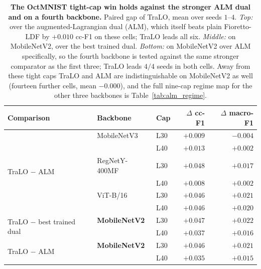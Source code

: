 \documentclass[10pt]{article}
\begin{document}
\begin{table}[t]\centering\small\color{blue}
\setlength{\tabcolsep}{5pt}
\caption{\color{blue}\textbf{The OctMNIST tight-cap win holds against the
stronger ALM dual and on a fourth backbone.} Paired gap of TraLO, mean over seeds
$1$--$4$. \emph{Top:} over the augmented-Lagrangian dual (ALM), which itself beats
plain Fioretto-LDF by $+0.010$ cc-F1 on these cells; TraLO leads all six.
\emph{Middle:} on MobileNetV2, over the best trained dual. \emph{Bottom:} on
MobileNetV2 over ALM specifically, so the fourth backbone is tested against the
same stronger comparator as the first three; TraLO leads $4/4$ seeds in both
cells. Away from these tight caps TraLO and ALM are indistinguishable on
MobileNetV2 as well (fourteen further cells, mean $-0.000$), and the full
nine-cap regime map for the other three backbones is
Table~\ref{tab:alm_regime}.}
\label{tab:almbb}
\begin{tabular}{lll rr}
\toprule
Comparison & Backbone & Cap & $\Delta$ cc-F1 & $\Delta$ macro-F1 \\
\midrule
\multirow{6}{*}{TraLO $-$ ALM}
 & MobileNetV3   & L30 & $+0.009$ & $-0.004$ \\
 &               & L40 & $+0.013$ & $+0.002$ \\
 & RegNetY-400MF & L30 & $+0.048$ & $+0.017$ \\
 &               & L40 & $+0.008$ & $+0.002$ \\
 & ViT-B/16      & L30 & $+0.046$ & $+0.021$ \\
 &               & L40 & $+0.046$ & $+0.020$ \\
\midrule
\multirow{2}{2.2cm}{TraLO $-$ best trained dual}
 & \textbf{MobileNetV2} & L30 & $+0.047$ & $+0.022$ \\
 &                      & L40 & $+0.037$ & $+0.016$ \\
\midrule
\multirow{2}{2.2cm}{{\color{blue}TraLO $-$ ALM}}
 & {\color{blue}\textbf{MobileNetV2}} & {\color{blue}L30} & {\color{blue}$+0.046$} & {\color{blue}$+0.021$} \\
 &                      & {\color{blue}L40} & {\color{blue}$+0.035$} & {\color{blue}$+0.015$} \\
\bottomrule
\end{tabular}
\end{table}
\end{document}
